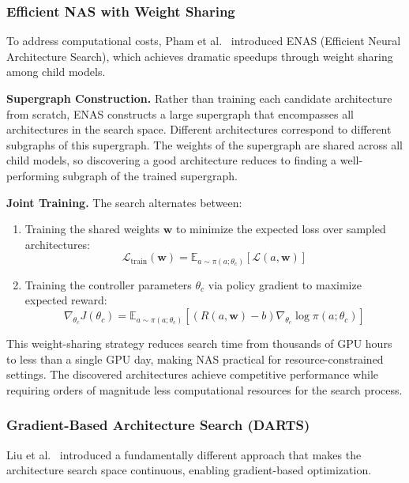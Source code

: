 \subsubsection{Efficient NAS with Weight Sharing}

To address computational costs, Pham et al.~\cite{pham2018efficient} introduced ENAS (Efficient Neural Architecture Search), which achieves dramatic speedups through weight sharing among child models.

\textbf{Supergraph Construction.} Rather than training each candidate architecture from scratch, ENAS constructs a large supergraph that encompasses all architectures in the search space. Different architectures correspond to different subgraphs of this supergraph. The weights of the supergraph are shared across all child models, so discovering a good architecture reduces to finding a well-performing subgraph of the trained supergraph.

\textbf{Joint Training.} The search alternates between:
\begin{enumerate}
\item Training the shared weights $\mathbf{w}$ to minimize the expected loss over sampled architectures:
\begin{equation}
\mathcal{L}_{\text{train}}(\mathbf{w}) = \mathbb{E}_{a \sim \pi(a;\theta_c)}[\mathcal{L}(a, \mathbf{w})]
\end{equation}

\item Training the controller parameters $\theta_c$ via policy gradient to maximize expected reward:
\begin{equation}
\nabla_{\theta_c} J(\theta_c) = \mathbb{E}_{a \sim \pi(a;\theta_c)}[(R(a,\mathbf{w}) - b) \nabla_{\theta_c} \log \pi(a;\theta_c)]
\end{equation}
\end{enumerate}

This weight-sharing strategy reduces search time from thousands of GPU hours to less than a single GPU day, making NAS practical for resource-constrained settings. The discovered architectures achieve competitive performance while requiring orders of magnitude less computational resources for the search process.

\subsubsection{Gradient-Based Architecture Search (DARTS)}

Liu et al.~\cite{liu2019darts} introduced a fundamentally different approach that makes the architecture search space continuous, enabling gradient-based optimization.

